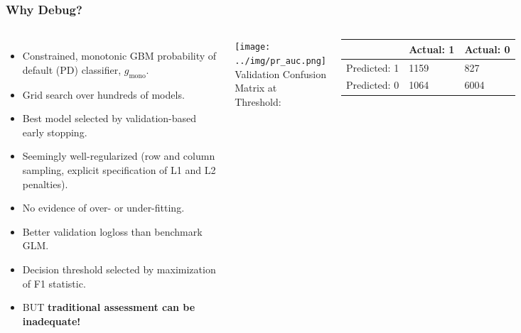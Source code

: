 \documentclass[11pt,
               aspectratio=169,
               hyperref={colorlinks}
               ]{beamer}
\begin{document}
			\begin{frame}

					\frametitle{Why Debug?}

					\begin{columns}
						
						\centering
						\begin{itemize}
							\item \scriptsize Constrained, monotonic GBM probability of default (PD) classifier, $g_{\text{mono}}$.
							\item Grid search over hundreds of models. 
							\item Best model selected by validation-based early stopping.
							\item Seemingly well-regularized (row and column sampling, explicit specification of L1 and L2 penalties).
							\item No evidence of over- or under-fitting.
							\item Better validation logloss than benchmark GLM.
							\item Decision threshold selected by maximization of F1 statistic.
							\item BUT \textbf{traditional assessment can be inadequate!} 
						\end{itemize}\normalsize
						
						\vspace{20pt}
							\centering
							\texttt{[image: ../img/pr\_auc.png]}\\
							\tiny
							\vspace{5pt}
							Validation Confusion Matrix at Threshold:\vspace{-7pt}
							\begin{table}
								\hspace{7pt}
								\begin{tabular}{ | p{1.3cm} | p{1cm} | p{1.3cm} | }
									\hline
								 	& Actual: 1 & Actual: 0 \\ 
									\hline
									Predicted: 1 & 1159	& 827 \\
									\hline
									Predicted: 0 & 1064	& 6004 \\
									\hline
								\end{tabular}	
							\end{table}	
						\normalsize
				
					\end{columns}
							
			\end{frame}
\end{document}
